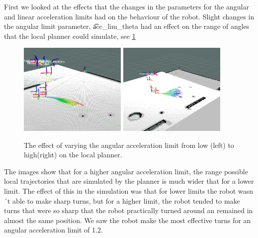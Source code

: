 First we looked at the effects that the changes in the parameters for the angular and linear acceleration limits had on the behaviour of the robot. Slight changes in the angular limit parameter, \t{acc_lim_theta} had an effect on the range of angles that the local planner could simulate, see \cref{fig:5:acc_lim_theta}

\begin{figure}
	\centering
	\includegraphics[width=0.46\textwidth]{./img/smallangularA}
	\includegraphics[width=0.46\textwidth]{./img/highangularA}
	\caption{The effect of varying the angular acceleration limit from low (left) to high(right) on the local planner.}
	\label{fig:5:acc_lim_theta}
\end{figure}

The images show that for a higher angular acceleration limit, the range possible local trajectories that are simulated by the planner is much wider that for a lower limit. The effect of this in the simulation was that for lower limits the robot wasn´t able to make sharp turns, but for a higher limit, the robot tended to make turns that were so sharp that the robot practically turned around an remained in almost the same position. We saw the robot make the most effective turns for an angular acceleration limit of 1.2.